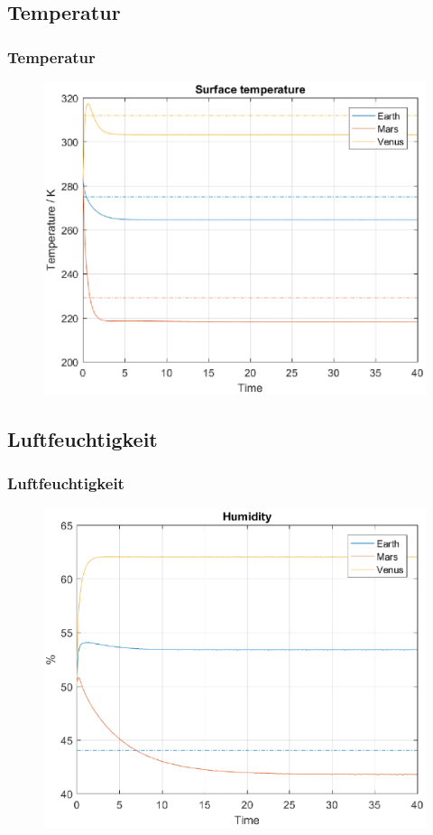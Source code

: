 \documentclass{beamer}
\begin{document}
\subsection{Temperatur}
\begin{frame}
	\frametitle{Temperatur}
		\begin{figure}
			\includegraphics[width=\linewidth]{Matlab/figures/surfaceTemperature.eps}
		\end{figure}
\end{frame}

\subsection{Luftfeuchtigkeit}
\begin{frame}
	\frametitle{Luftfeuchtigkeit}
		\begin{figure}
			\includegraphics[width=\linewidth]{Matlab/figures/humidity.eps}
		\end{figure}
\end{frame}
\end{document}
